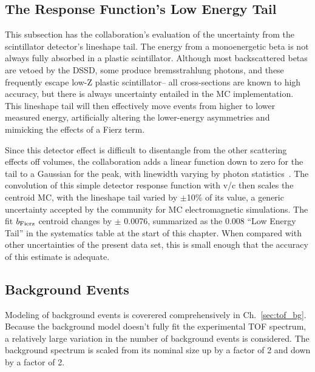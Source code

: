 \FloatBarrier
\subsection{The Response Function's Low Energy Tail}

This subsection has the collaboration's evaluation of the uncertainty from
the scintillator detector's lineshape tail.
The energy from a monoenergetic beta is not always fully absorbed
in a plastic scintillator.
Although most backscattered betas are vetoed by the DSSD,
some produce bremsstrahlung photons,
and these frequently escape low-Z plastic scintillator-- all cross-sections
are known to high accuracy, but there is always uncertainty entailed in  the
MC implementation.
This lineshape tail will then effectively move events from higher to lower measured
energy, artificially altering the lower-energy asymmetries and mimicking the effects of a
Fierz term.

Since this detector effect is difficult to disentangle from the other scattering
effects off volumes,
the collaboration adds a linear function down to zero for the tail to
a Gaussian for the peak,
with linewidth varying by photon statistics~\cite{clifford}.
The convolution of this simple detector response function with v/c then scales the
centroid MC, with the lineshape tail varied by $\pm$10\% of its value,
a generic uncertainty accepted by the community for MC electromagnetic simulations.
The fit $b_{\rm Fierz}$ centroid changes by $\pm$ 0.0076, summarized
as the 0.008 ``Low Energy Tail'' in the systematics table at the start of this chapter.
When compared with other uncertainties of the present data set,
this is small enough that the accuracy of this estimate is adequate.

\subsection{Background Events}
\label{section:background_events_systematics}
Modeling of background events is coverered comprehensively in Ch.~\ref{sec:tof_bg}.  Because the background model doesn't fully fit the experimental TOF spectrum, a relatively large variation in the number of background events is considered.  The background spectrum is scaled from its nominal size up by a factor of 2 and down by a factor of 2.  

